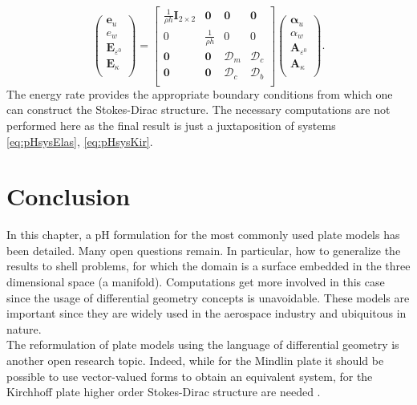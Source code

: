 \begin{equation}
\begin{pmatrix}
\bm{e}_u \\
e_w \\
\bm{E}_{\varepsilon^0} \\
\bm{E}_{\kappa} \\
\end{pmatrix}
= 
\begin{bmatrix}
\frac{1}{\rho h}\bm{I}_{2 \times 2} & \bm{0} & \bm{0} &  \bm{0} \\
0 & \frac{1}{\rho h} & 0 & 0  \\
\bm{0} & \bm{0} & \bm{\mathcal{D}}_m & \bm{\mathcal{D}}_c \\
\bm{0} & \bm{0} & \bm{\mathcal{D}}_c & \bm{\mathcal{D}}_b \\
\end{bmatrix}
\begin{pmatrix}
\bm\alpha_u \\
\alpha_w \\
\bm{A}_{\varepsilon^0} \\
\bm{A}_\kappa \\
\end{pmatrix}.
\end{equation}
The energy rate provides the appropriate boundary conditions from which one can construct the Stokes-Dirac structure. The necessary computations are not performed here as the final result is just a juxtaposition of systems \eqref{eq:pHsysElas}, \eqref{eq:pHsysKir}.


\section{Conclusion}

In this chapter, a pH formulation for the most commonly used plate models has been detailed. Many open questions remain. In particular, how to generalize the results to shell problems, for which the domain is a surface embedded in the three dimensional space (a manifold). Computations get more involved in this case since the usage of differential geometry concepts is unavoidable. These models are important since they are widely used in the aerospace industry and ubiquitous in nature. \\

The reformulation of plate models using the language of differential geometry is another open research topic. Indeed, while for the Mindlin plate it should be possible to use vector-valued forms to obtain an equivalent system, for the Kirchhoff plate higher order Stokes-Dirac structure are needed \cite{nishida2004}. 